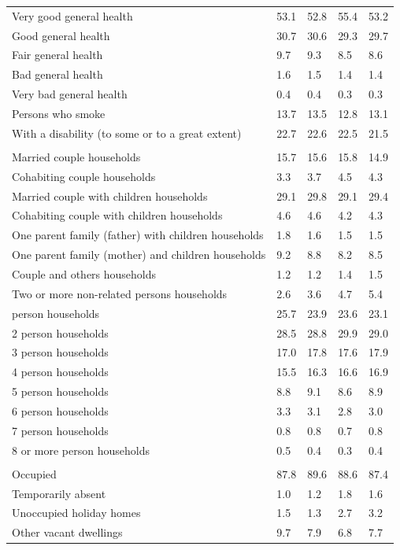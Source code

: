 \documentclass{article}
\begin{document}
\begin{table}[h]
\begin{tabular}{KTTTT}
    \hline
Very good general health & 53.1& 52.8&55.4& 53.2\\
Good general health & 30.7& 30.6& 29.3& 29.7\\
Fair general health & 9.7& 9.3&8.5& 8.6\\
Bad general health & 1.6& 1.5&1.4& 1.4\\
Very bad general health & 0.4& 0.4&0.3& 0.3\\
    \hline
Persons who smoke & 13.7& 13.5&12.8& 13.1\\
    \hline
With a disability (to some or to a great extent) & 22.7& 22.6&22.5& 21.5\\
\hline
    \\ 
    \hline
Married couple households & 15.7& 15.6& 15.8& 14.9\\
Cohabiting couple households & 3.3& 3.7& 4.5& 4.3\\
Married couple with children households & 29.1& 29.8& 29.1& 29.4\\
Cohabiting couple with children households & 4.6& 4.6& 4.2& 4.3\\
One parent family (father) with  children households & 1.8& 1.6& 1.5& 1.5\\
One parent family (mother) and children households & 9.2& 8.8& 8.2& 8.5\\
Couple and others households  & 1.2& 1.2& 1.4& 1.5\\
Two or more non-related persons households & 2.6& 3.6& 4.7& 5.4\\
     person households & 25.7& 23.9& 23.6& 23.1\\
2 person households & 28.5& 28.8& 29.9& 29.0\\
3 person households & 17.0& 17.8& 17.6& 17.9\\
4 person households & 15.5& 16.3& 16.6& 16.9\\
5 person households & 8.8& 9.1& 8.6& 8.9\\
6 person households & 3.3& 3.1& 2.8& 3.0\\
7 person households & 0.8& 0.8& 0.7& 0.8\\
8 or more person households & 0.5& 0.4& 0.3& 0.4\\
\hline
    \\ 
    \hline
Occupied & 87.8& 89.6& 88.6& 87.4\\
Temporarily absent & 1.0& 1.2& 1.8& 1.6\\
Unoccupied holiday homes & 1.5& 1.3& 2.7& 3.2\\
Other vacant dwellings & 9.7& 7.9& 6.8& 7.7\\
\hline
\end{tabular}
\end{table}
\end{document}

